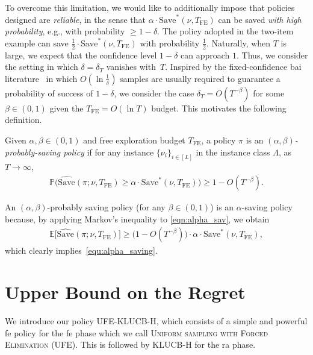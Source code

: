 \documentclass[twoside,11pt]{article}
\newcommand{\bbE}{\mathbb{E}}
\newcommand{\bbP}{\mathbb{P}}
\newcommand{\Tfe}{T_{\mathrm{FE}}}
\newcommand{\Saved}{\mathrm{Save}}
\newcommand{\ouralg}{\textsc{UFE-KLUCB-H}}
\newcommand{\ouralgfe}{\textsc{UFE}}
\newcommand{\klucbh}{\textsc{KLUCB-H}}
\begin{document}
To overcome this limitation, we would like to additionally impose that policies designed are \emph{reliable}, in the sense that $\alpha\cdot\Saved^*(\nu,\Tfe)$ can be saved \emph{with high probability}, e.g., with probability $\ge 1-\delta$. 
The policy adopted in the two-item example can save $\frac{1}{2}\cdot \Saved^*(\nu,\Tfe)$ with probability $\frac{1}{2}$.
Naturally, when $T$ is large, we expect that the confidence level $1-\delta$ can approach $1$. Thus, we consider the setting in which  $\delta=\delta_T$ vanishes with~$T$. Inspired by the fixed-confidence \ac{bai} literature~\citep{kaufmann2016complexity,garivier2016optimal,karnin2013optimal,jamieson2014best} in which  $O(\ln \frac{1}{\delta})$ samples are usually required to guarantee a probability of success of $1-\delta$, we consider the case $\delta_T = O(T^{-\beta})$ for some $\beta\in(0,1)$ given the $\Tfe=O(\ln T)$ budget. This motivates the following definition.
\begin{definition}\label{def:absaving}
    Given $\alpha,\beta\in(0,1)$ and free exploration budget $\Tfe$,
    a policy $\pi$ is an {\em $(\alpha, \beta)$-probably-saving  policy} if 
    for any instance $\{\nu_i\}_{i\in[L]}$ in the instance class $\Lambda$, as $T\to\infty$,
    \begin{align}
        \bbP\big(
            \widehat{\Saved}(\pi;\nu,\Tfe)\ge\alpha \cdot\Saved^*(\nu,\Tfe)
        \big)
        \ge
        1 -O(T^{-\beta}). \label{eqn:alpha_sav}
    \end{align}
\end{definition}
\begin{remark} An $(\alpha,\beta)$-probably saving policy (for any $\beta \in (0,1)$) is an $\alpha$-saving policy because, by applying Markov's inequality to \eqref{eqn:alpha_sav}, we obtain 
\begin{align}
    \bbE\big[\widehat{\Saved}(\pi;\nu,\Tfe)\big]\ge
    \big(1 -O(T^{-\beta}) \big)\cdot\alpha\cdot\Saved^*(\nu,\Tfe),
\end{align}
which  clearly implies~\eqref{equ:alpha_saving}. 
\end{remark} 

\section{Upper Bound on the Regret}\label{sec:upbd}
We introduce our policy \ouralg{}, which consists of a simple and powerful \ac{fe} policy for the \ac{fe} phase which we call \textsc{Uniform sampling with Forced Elimination} (\ouralgfe{}). This is  followed by \klucbh{}  for the \ac{ra} phase.  
\end{document}
